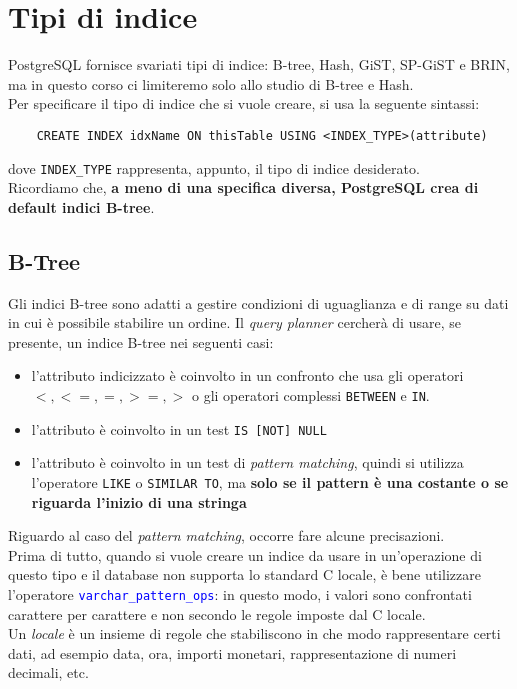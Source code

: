 \documentclass[12pt,a4paper]{book}
\begin{document}
	\section{Tipi di indice}
	PostgreSQL fornisce svariati tipi di indice: B-tree, Hash, GiST, SP-GiST e BRIN, ma in questo corso ci limiteremo solo allo studio di B-tree e Hash.\\Per specificare il tipo di indice che si vuole creare, si usa la seguente sintassi:
	\begin{lstlisting}
	CREATE INDEX idxName ON thisTable USING <INDEX_TYPE>(attribute)
	\end{lstlisting}
	dove \texttt{INDEX_TYPE} rappresenta, appunto, il tipo di indice desiderato.\\
	Ricordiamo che, \textbf{a meno di una specifica diversa, PostgreSQL crea di default indici B-tree}.
	\subsection{B-Tree} Gli indici B-tree sono adatti a gestire condizioni di uguaglianza e di range su dati in cui è possibile stabilire un ordine. Il \textit{query planner} cercherà di usare, se presente, un indice B-tree nei seguenti casi:
	\begin{itemize}
		\item l'attributo indicizzato è coinvolto in un confronto che usa gli operatori $ <, <=, =, >=, >$ o gli operatori complessi \texttt{BETWEEN} e \texttt{IN}.
		\item l'attributo è coinvolto in un test \texttt{IS [NOT] NULL}
		\item l'attributo è coinvolto in un test di \textit{pattern matching}, quindi si utilizza l'operatore \texttt{LIKE} o \texttt{SIMILAR TO}, ma \textbf{solo se il pattern è una costante o se riguarda l'inizio di una stringa}
	\end{itemize}
	Riguardo al caso del \textit{pattern matching}, occorre fare alcune precisazioni. \\Prima di tutto, quando si vuole creare un indice da usare in un'operazione di questo tipo e il database non supporta lo standard C locale, è bene utilizzare l'operatore \textcolor{blue}{\texttt{varchar_pattern_ops}}: in questo modo, i valori sono confrontati carattere per carattere e non secondo le regole imposte dal C locale.\\
	Un \textit{locale} è un insieme di regole che stabiliscono in che modo rappresentare certi dati, ad esempio data, ora, importi monetari, rappresentazione di numeri decimali, etc.\\
\end{document}
